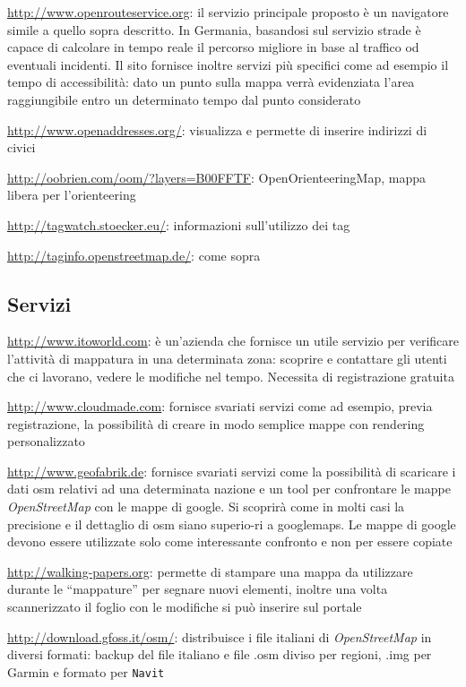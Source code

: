 \documentclass[a4paper,twoside,12pt,]{article}
\newcommand{\osm}{\emph{OpenStreetMap}\xspace}
\newcommand{\soft}[1]{\texttt{#1}}
\begin{document}
\url{http://www.openrouteservice.org}: il servizio principale proposto è un navigatore simile a quello sopra descritto. In Germania, basandosi sul servizio strade è capace di calcolare in tempo reale il percorso migliore in base al traffico od eventuali incidenti. Il sito fornisce inoltre servizi più specifici come ad esempio il tempo di accessibilità: dato un punto sulla mappa verrà evidenziata l'area raggiungibile entro un determinato tempo dal punto considerato

\url{http://www.openaddresses.org/}: visualizza e permette di inserire indirizzi di civici

\url{http://oobrien.com/oom/?layers=B00FFTF}: OpenOrienteeringMap, mappa libera per l'orienteering

\url{http://tagwatch.stoecker.eu/}: informazioni sull'utilizzo dei tag

\url{http://taginfo.openstreetmap.de/}: come sopra

\subsection{Servizi}

\url{http://www.itoworld.com}: è un'azienda che fornisce un utile servizio per verificare l'attività di mappatura in una determinata zona: scoprire  e contattare gli utenti che ci lavorano, vedere le modifiche nel tempo. Necessita di registrazione gratuita

\url{http://www.cloudmade.com}: fornisce svariati servizi come ad esempio, previa registrazione, la possibilità di creare in modo semplice mappe con rendering personalizzato

\url{http://www.geofabrik.de}: fornisce svariati servizi come la possibilità di scaricare i dati osm relativi ad una determinata nazione e un tool per confrontare le mappe \osm con le mappe di google. Si scoprirà come in molti casi la precisione e il dettaglio di osm siano superio-ri a googlemaps. Le mappe di google devono essere utilizzate solo come interessante confronto e non per essere copiate

\url{http://walking-papers.org}: permette di stampare una mappa da utilizzare durante le ``mappature'' per segnare nuovi elementi, inoltre una volta scannerizzato il foglio con le modifiche si può inserire sul portale

\url{http://download.gfoss.it/osm/}: distribuisce i file italiani di \osm in diversi formati: backup del file italiano e file .osm diviso per regioni, .img per Garmin e formato per \soft{Navit}
\end{document}
